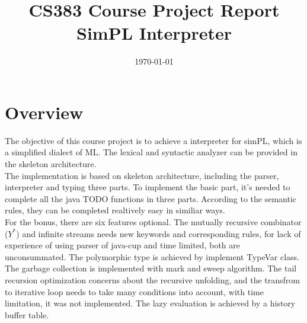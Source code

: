 \documentclass[paper=a4, fontsize=11pt]{scrartcl}
\title{ 
\normalfont \normalsize 
\huge CS383 Course Project Report \\ SimPL Interpreter %
}
\date{\today} %
\begin{document}
\maketitle %




\section{Overview}

The objective of this course project is to achieve a interpreter for simPL, which is a  simplified dialect of ML. The lexical and syntactic analyzer can be provided in the skeleton architecture.\\
The implementation is based on skeleton architecture, including the parser, interpreter and typing three parts. To implement the basic part, it's needed to complete all the java TODO functions in three parts. According to the semantic rules, they can be completed realtively easy in similiar ways. \\
For the bonus, there are six features optional. The mutually recursive combinator ($Y^*$) and infinite streams needs new keywords and corresponding rules, for lack of experience of using parser of java-cup and time limited, both are unconsummated. The polymorphic type is achieved by implement TypeVar class. The garbage collection is implemented with mark and sweep algorithm. The tail recursion optimization concerns about the recursive unfolding, and the transfrom to iterative loop needs to take many conditions into account, with time limitation, it was not implemented. The lazy evaluation is achieved by a history buffer table.
\end{document}
